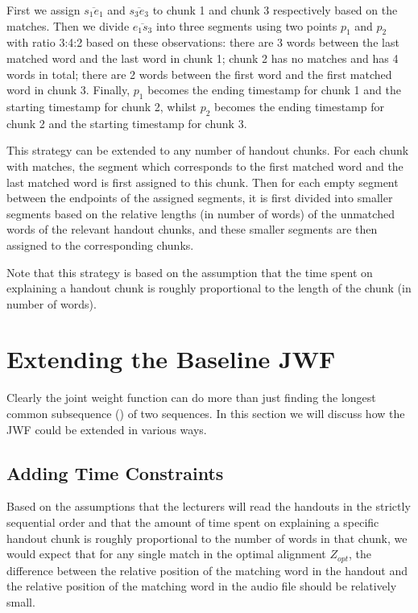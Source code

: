 First we assign $\overline{s_1 e_1}$ and $\overline{s_3 e_3}$ to chunk 1 and chunk 3 respectively based on the matches. Then we divide $\overline{e_1 s_3}$ into three segments using two points $p_1$ and $p_2$ with ratio 3:4:2 based on these observations: there are 3 words between the last matched word and the last word in chunk 1; chunk 2 has no matches and has 4 words in total; there are 2 words between the first word and the first matched word in chunk 3. Finally, $p_1$ becomes the ending timestamp for chunk 1 and the starting timestamp for chunk 2, whilst $p_2$ becomes the ending timestamp for chunk 2 and the starting timestamp for chunk 3.

This strategy can be extended to any number of handout chunks. For each chunk with matches, the segment which corresponds to the first matched word and the last matched word is first assigned to this chunk. Then for each empty segment between the endpoints of the assigned segments, it is first divided into smaller segments based on the relative lengths (in number of words) of the unmatched words of the relevant handout chunks, and these smaller segments are then assigned to the corresponding chunks.

Note that this strategy is based on the assumption that the time spent on explaining a handout chunk is roughly proportional to the length of the chunk (in number of words).


\section{Extending the Baseline JWF}

Clearly the joint weight function can do more than just finding the longest common subsequence () of two sequences. In this section we will discuss how the JWF could be extended in various ways.

\subsection{Adding Time Constraints}
\label{subsec:time-constraint}

Based on the assumptions that the lecturers will read the handouts in the strictly sequential order and that the amount of time spent on explaining a specific handout chunk is roughly proportional to the number of words in that chunk, we would expect that for any single match in the optimal alignment $Z_{opt}$, the difference between the relative position of the matching word in the handout and the relative position of the matching word in the audio file should be relatively small. 

